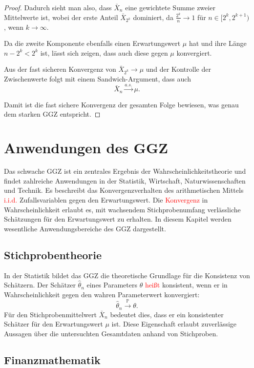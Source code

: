\documentclass[aodsor,preprint]{imsart}
\numberwithin{equation}{section}
\theoremstyle{plain}
\begin{document}
\begin{proof}
Dadurch sieht man also, dass \( \bar{X}_n \) eine gewichtete Summe zweier Mittelwerte ist, wobei der erste Anteil \( \bar{X}_{2^k} \) dominiert, da \( \frac{2^k}{n} \to 1 \) für \( n \in [2^k, 2^{k+1}) \), wenn \( k \to \infty \).

Da die zweite Komponente ebenfalls einen Erwartungswert \( \mu \) hat und ihre Länge \( n - 2^k < 2^k \) ist, lässt sich zeigen, dass auch diese gegen \( \mu \) konvergiert.

Aus der fast sicheren Konvergenz von \( \bar{X}_{2^k} \to \mu \) und der Kontrolle der Zwischenwerte folgt mit einem Sandwich-Argument, dass auch
\[
\bar{X}_n \xrightarrow{a.s.} \mu.
\]

Damit ist die fast sichere Konvergenz der gesamten Folge bewiesen, was genau dem starken GGZ entspricht.
\end{proof}


\section{Anwendungen des GGZ}
\label{sec:anwendung}


Das schwache GGZ ist ein zentrales Ergebnis der Wahrscheinlichkeitstheorie und findet zahlreiche Anwendungen in der Statistik, Wirtschaft, Naturwissenschaften und Technik.
Es beschreibt das Konvergenzverhalten des arithmetischen Mittels \textcolor{red}{i.i.d.} Zufallsvariablen gegen den Erwartungswert.
Die \textcolor{red}{Konvergenz} in Wahrscheinlichkeit erlaubt es, mit wachsendem Stichprobenumfang verlässliche Schätzungen für den Erwartungswert zu erhalten.
In diesem Kapitel werden wesentliche Anwendungsbereiche des GGZ dargestellt.


\subsection{Stichprobentheorie}


In der Statistik bildet das GGZ die theoretische Grundlage für die Konsistenz von Schätzern. Der Schätzer \( \hat{\theta}_n \) eines Parameters \( \theta \) \textcolor{red}{heißt} konsistent, wenn er in Wahrscheinlichkeit gegen den wahren Parameterwert konvergiert:
\[
\hat{\theta}_n \xrightarrow{\mathbb{P}} \theta.
\]
Für den Stichprobenmittelwert \( \bar{X}_n \) bedeutet dies, dass er ein konsistenter Schätzer für den Erwartungswert \( \mu \) ist. Diese Eigenschaft erlaubt zuverlässige Aussagen über die untersuchten Gesamtdaten anhand von Stichproben.


\subsection{Finanzmathematik}
\end{document}
